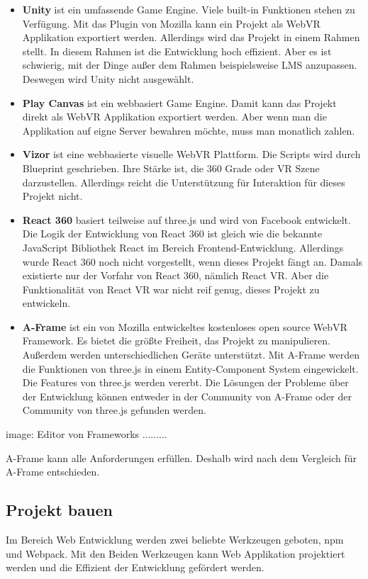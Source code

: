  \begin{itemize}
     \item \textbf{Unity} ist ein umfassende Game Engine. Viele built-in Funktionen stehen zu Verfügung. Mit das Plugin von Mozilla kann ein Projekt als WebVR Applikation exportiert werden. Allerdings wird das Projekt in einem Rahmen stellt. In diesem Rahmen ist die Entwicklung hoch effizient. Aber es ist schwierig, mit der Dinge außer dem Rahmen beispielsweise LMS anzupassen. Deswegen wird Unity nicht ausgewählt.
     \item \textbf{Play Canvas} ist ein webbasiert Game Engine. Damit kann das Projekt direkt als WebVR Applikation exportiert werden. Aber wenn man die Applikation auf eigne Server bewahren möchte, muss man monatlich zahlen.
     \item \textbf{Vizor} ist eine webbasierte visuelle WebVR Plattform. Die Scripts wird durch Blueprint geschrieben. Ihre Stärke ist, die 360 Grade oder VR Szene darzustellen. Allerdings reicht die Unterstützung für Interaktion für dieses Projekt nicht.
     \item \textbf{React 360} basiert teilweise auf three.js und wird von Facebook entwickelt. Die Logik der Entwicklung von React 360 ist gleich wie die bekannte JavaScript Bibliothek React im Bereich Frontend-Entwicklung. Allerdings wurde React 360 noch nicht vorgestellt, wenn dieses Projekt fängt an. Damals existierte nur der Vorfahr von React 360, nämlich React VR. Aber die Funktionalität von React VR war nicht reif genug, dieses Projekt zu entwickeln.
     \item \textbf{A-Frame} ist ein von Mozilla entwickeltes kostenloses open source WebVR Framework. Es bietet die größte Freiheit, das Projekt zu manipulieren. Außerdem werden unterschiedlichen Geräte unterstützt. Mit A-Frame werden die Funktionen von three.js in einem Entity-Component System eingewickelt. Die Features von three.js werden vererbt. Die Lösungen der Probleme über der Entwicklung können entweder in der Community von A-Frame oder der Community von three.js gefunden werden.
 \end{itemize}
 
 image: Editor von Frameworks .........
 
 A-Frame kann alle Anforderungen erfüllen. Deshalb wird nach dem Vergleich für A-Frame entschieden.
 
 \subsection{Projekt bauen}
 Im Bereich Web Entwicklung werden zwei beliebte Werkzeugen geboten, npm und Webpack. Mit den Beiden Werkzeugen kann Web Applikation projektiert werden und die Effizient der Entwicklung gefördert werden.
 
